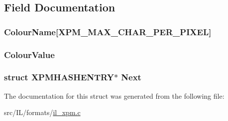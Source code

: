 \subsection{Field Documentation}
\hypertarget{struct_x_p_m_h_a_s_h_e_n_t_r_y_a6c12e83f591ef5b7f01f0bc49ef510de}{
\subsubsection[{Colour\-Name}]{ Colour\-Name\mbox{[}{\bf X\-P\-M\-\_\-\-M\-A\-X\-\_\-\-C\-H\-A\-R\-\_\-\-P\-E\-R\-\_\-\-P\-I\-X\-E\-L}\mbox{]}}}\label{struct_x_p_m_h_a_s_h_e_n_t_r_y_a6c12e83f591ef5b7f01f0bc49ef510de}
\hypertarget{struct_x_p_m_h_a_s_h_e_n_t_r_y_acf7fbbc3981f642afb9e8be15c60589d}{
\subsubsection[{Colour\-Value}]{ Colour\-Value}}\label{struct_x_p_m_h_a_s_h_e_n_t_r_y_acf7fbbc3981f642afb9e8be15c60589d}
\hypertarget{struct_x_p_m_h_a_s_h_e_n_t_r_y_a349596333e7264c7e9271d9c3e5ef2f4}{
\subsubsection[{Next}]{\setlength{\rightskip}{0pt plus 5cm}struct {\bf X\-P\-M\-H\-A\-S\-H\-E\-N\-T\-R\-Y}$\ast$ Next}}\label{struct_x_p_m_h_a_s_h_e_n_t_r_y_a349596333e7264c7e9271d9c3e5ef2f4}


The documentation for this struct was generated from the following file\-:\begin{DoxyCompactItemize}
\item 
src/\-I\-L/formats/\hyperlink{il__xpm_8c}{il\-\_\-xpm.\-c}\end{DoxyCompactItemize}
